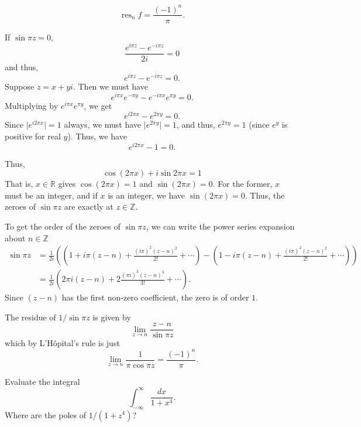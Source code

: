 \documentclass[12 pt, letterpaper]{hmcpset}
\begin{document}
\begin{solution}
	\[
		\boxed{
			\operatorname{res}_{n} f = \frac{(-1)^{n}}{\pi}.
		}
	\]

	If $\sin{\pi z} = 0$,
	\[
		\frac{e^{i \pi z} - e^{- i \pi z}}{2 i} = 0
	\]
	and thus,
	\[
		e^{i \pi z} - e^{- i \pi z} = 0.
	\]
	Suppose $z = x + y i$. Then we must have
	\[
		e^{i \pi x} e^{- \pi y} - e^{- i \pi x} e^{\pi y} = 0.
	\]
	Multiplying by $e^{i \pi x} e^{\pi y}$, we get
	\[
		e^{i 2 \pi x} - e^{2 \pi y} = 0.
	\]
	Since $\lvert e^{i 2 \pi x} \rvert = 1$ always, we must have $\lvert e^{2 \pi y} \rvert = 1$, and thus, $e^{2 \pi y} = 1$ (since $e^{y}$ is positive for real $y$). Thus, we have
	\[
		e^{i 2 \pi x} - 1 = 0.
	\]

	Thus,
	\[
		\cos{(2 \pi x)} + i \sin{2 \pi x} = 1
	\]
	That is, $x \in \mathbb{R}$ gives $\cos{(2 \pi x)} = 1$ and $\sin{(2 \pi x) = 0}$. For the former, $x$ must be an integer, and if $x$ is an integer, we have $\sin{(2 \pi x)} = 0$. Thus, the zeroes of $\sin{\pi z}$ are exactly at $z \in \mathbb{Z}$.

	To get the order of the zeroes of $\sin{\pi z}$, we can write the power series expansion about $n \in \mathbb{Z}$
	\[
		\begin{split}
			\sin{\pi z} & = \frac{1}{2 i} \left ( \left ( 1 + i \pi (z - n) + \frac{(i \pi)^{2} (z - n)^{2}}{2!} + \cdots \right ) - \left ( 1 - i \pi(z - n) + \frac{(i \pi)^{2} (z - n)^{2}}{2!} + \cdots \right ) \right ) \\	
				    & = \frac{1}{2 i} \left ( 2 \pi i (z - n) +  2 \frac{(\pi i)^{3} (z - n)^{3}}{3!} + \cdots \right ).
		\end{split} 
	\]
	Since $(z - n)$ has the first non-zero coefficient, the zero is of order $1$.

	The residue of $1 / \sin{\pi z}$ is given by
	\[
		\lim_{z \to n} \frac{z - n}{\sin{\pi z}}
	\]
	which by L'H\^{o}pital's rule is just
	\[
		\lim_{z \to n} \frac{1}{\pi \cos{\pi z}} = \frac{(-1)^{n}}{\pi}.
	\]
\end{solution}

\pagebreak

\begin{problem}[2]
	Evaluate the integral
	\[
		\int_{-\infty}^{\infty} \frac{dx}{1 + x^{4}}.
	\]
	Where are the poles of $1 / (1 + z^{4})$?
\end{problem}
\end{document}

